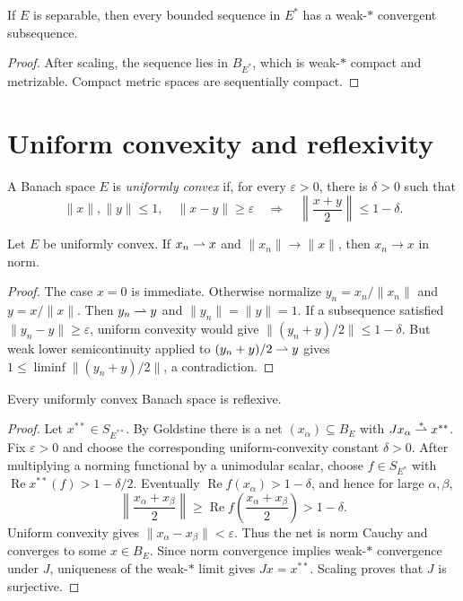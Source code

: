 \begin{notecorollary}
If $E$ is separable, then every bounded sequence in $E^*$ has a weak-$*$
convergent subsequence.
\end{notecorollary}

\begin{proof}
After scaling, the sequence lies in $B_{E^*}$, which is weak-$*$ compact and
metrizable.  Compact metric spaces are sequentially compact.
\end{proof}

\section{Uniform convexity and reflexivity}

\begin{notedefinition}
A Banach space $E$ is \emph{uniformly convex} if, for every $\varepsilon>0$,
there is $\delta>0$ such that
\[
  \|x\|,\|y\|\le1,
  \quad \|x-y\|\ge\varepsilon
  \quad\Longrightarrow\quad
  \left\|\frac{x+y}{2}\right\|\le1-\delta.
\]
\end{notedefinition}

\begin{noteproposition}
Let $E$ be uniformly convex.  If $x_n\rightharpoonup x$ and
$\|x_n\|\to\|x\|$, then $x_n\to x$ in norm.
\end{noteproposition}

\begin{proof}
The case $x=0$ is immediate.  Otherwise normalize
$y_n=x_n/\|x_n\|$ and $y=x/\|x\|$.  Then $y_n\rightharpoonup y$ and
$\|y_n\|=\|y\|=1$.  If a subsequence satisfied
$\|y_n-y\|\ge\varepsilon$, uniform convexity would give
$\|(y_n+y)/2\|\le1-\delta$.  But weak lower semicontinuity applied to
$(y_n+y)/2\rightharpoonup y$ gives
$1\le\liminf\|(y_n+y)/2\|$, a contradiction.
\end{proof}

\begin{notetheorem}
Every uniformly convex Banach space is reflexive.
\end{notetheorem}

\begin{proof}
Let $x^{**}\in S_{E^{**}}$.  By Goldstine there is a net
$(x_\alpha)\subseteq B_E$ with $Jx_\alpha\overset{*}{\rightharpoonup} x^{**}$.  Fix
$\varepsilon>0$ and choose the corresponding uniform-convexity constant
$\delta>0$.  After multiplying a norming functional by a unimodular scalar, choose
$f\in S_{E^*}$ with
$\operatorname{Re}x^{**}(f)>1-\delta/2$.  Eventually
$\operatorname{Re}f(x_\alpha)>1-\delta$, and hence for
large $\alpha,\beta$,
\[
  \left\|\frac{x_\alpha+x_\beta}{2}\right\|
  \ge \operatorname{Re}f\!\left(\frac{x_\alpha+x_\beta}{2}\right)
  >1-\delta.
\]
Uniform convexity gives $\|x_\alpha-x_\beta\|<\varepsilon$.  Thus the net is
norm Cauchy and converges to some $x\in B_E$.  Since norm convergence implies
weak-$*$ convergence under $J$, uniqueness of the weak-$*$ limit gives
$Jx=x^{**}$.  Scaling proves that $J$ is surjective.
\end{proof}
